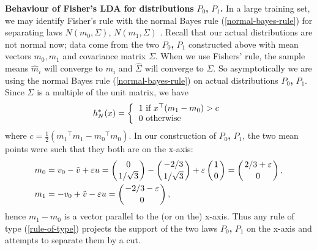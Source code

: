 \documentclass[11pt,twoside]{article}%
\theoremstyle{change}
\begin{document}
\textbf{Behaviour of Fisher's LDA for distributions }$P_{0}$\textbf{, }$P_{1}
$\textbf{.} In a large training set, we may identify Fisher's rule with the
normal Bayes rule (\ref{normal-bayes-rule}) for separating laws $N(m_{0}%
,\Sigma)$, $N(m_{1},\Sigma)$ . Recall that our actual distributions are not
normal now; data come from the two $P_{0}$\textbf{, }$P_{1}$ constructed above
with mean vectors $m_{0},m_{1}$ and covariance matrix $\Sigma$. When we use
Fishers' rule, the sample means $\hat{m}_{i}$ will converge to $m_{i}$ and
$\hat{\Sigma}$ will converge to $\Sigma$. So asymptotically we are using the
normal Bayes rule (\ref{normal-bayes-rule}) on actual distributions $P_{0}%
$\textbf{, }$P_{1}$. Since $\Sigma$ is a multiple of the unit matrix, we have
\begin{equation}
h_{N}^{\ast}(x)=\left\{
\begin{tabular}
[c]{l}%
$1$ if $x^{\top}(m_{1}-m_{0})>c$\\
$0$ otherwise
\end{tabular}
\right. \label{rule-of-type}%
\end{equation}
where $c=\frac{1}{2}\left(  m_{1}{}^{\top}m_{1}-m_{0}{}^{\top}m_{0}\right)  $.
In our construction of $P_{0}$\textbf{, }$P_{1}$, the two mean points were
such that they both are on the x-axis:
\begin{align*}
m_{0}  & =v_{0}-\tilde{v}+\varepsilon u=\left(
\genfrac{}{}{0pt}{}{0}{1/\sqrt{3}}%
\right)  -\left(
\genfrac{}{}{0pt}{}{-2/3}{1/\sqrt{3}}%
\right)  +\varepsilon\left(
\genfrac{}{}{0pt}{}{1}{0}%
\right)  =\left(
\genfrac{}{}{0pt}{}{2/3+\varepsilon}{0}%
\right)  ,\\
m_{1}  & =-v_{0}+\tilde{v}-\varepsilon u=\left(
\genfrac{}{}{0pt}{}{-2/3-\varepsilon}{0}%
\right)  ,
\end{align*}
hence $m_{1}-m_{0}$ is a vector parallel to the (or on the) x-axis. Thus any
rule of type (\ref{rule-of-type}) projects the support of the two laws $P_{0}
$\textbf{, }$P_{1}$ on the x-axis and attempts to separate them by a cut.
\end{document}
